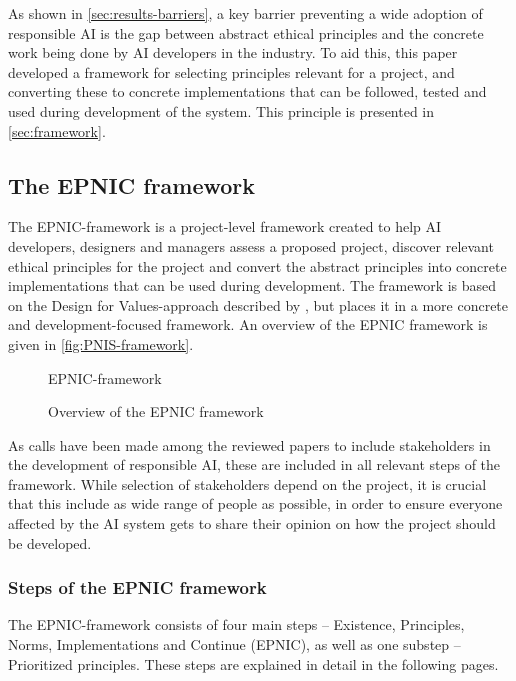 As shown in \autoref{sec:results-barriers}, a key barrier preventing a wide adoption of responsible AI is the gap between abstract ethical principles and the concrete work being done by AI developers in the industry. To aid this, this paper developed a framework for selecting principles relevant for a project, and converting these to concrete implementations that can be followed, tested and used during development of the system. This principle is presented in \autoref{sec:framework}.


\subsection{The EPNIC framework}
\label{sec:framework}
The EPNIC-framework is a project-level framework created to help AI developers, designers and managers assess a proposed project, discover relevant ethical principles for the project and convert the abstract principles into concrete implementations that can be used during development. The framework is based on the Design for Values-approach described by \textcite{Dignum_2019}, but places it in a more concrete and development-focused framework. An overview of the EPNIC framework is given in \autoref{fig:PNIS-framework}.

\begin{figure}[htp]
    \centering
    {EPNIC-framework}
    \caption{Overview of the EPNIC framework}
    \label{fig:PNIS-framework}
\end{figure}

As calls have been made among the reviewed papers to include stakeholders in the development of responsible AI, these are included in all relevant steps of the framework. While selection of stakeholders depend on the project, it is crucial that this include as wide range of people as possible, in order to ensure everyone affected by the AI system gets to share their opinion on how the project should be developed.

\subsubsection{Steps of the EPNIC framework}
The EPNIC-framework consists of four main steps -- Existence, Principles, Norms, Implementations and Continue (EPNIC), as well as one substep -- Prioritized principles. These steps are explained in detail in the following pages.

